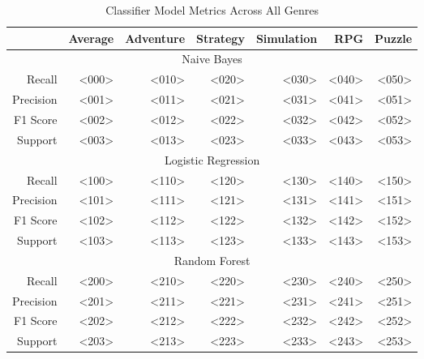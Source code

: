 \begin{table}[h]
    \centering
    \begin{tabular}{r|r|r|r|r|r|r}
        & Average & Adventure & Strategy & Simulation & RPG & Puzzle \\\hline
        \multicolumn{7}{c}{Naive Bayes} \\\hline
        Recall      & <000> & <010> & <020> & <030> & <040> & <050> \\
        Precision   & <001> & <011> & <021> & <031> & <041> & <051> \\
        F1 Score    & <002> & <012> & <022> & <032> & <042> & <052> \\
        Support     & <003> & <013> & <023> & <033> & <043> & <053> \\\hline
        \multicolumn{7}{c}{Logistic Regression} \\\hline
        Recall      & <100> & <110> & <120> & <130> & <140> & <150> \\
        Precision   & <101> & <111> & <121> & <131> & <141> & <151> \\
        F1 Score    & <102> & <112> & <122> & <132> & <142> & <152> \\
        Support     & <103> & <113> & <123> & <133> & <143> & <153> \\\hline
        \multicolumn{7}{c}{Random Forest} \\\hline
        Recall      & <200> & <210> & <220> & <230> & <240> & <250> \\
        Precision   & <201> & <211> & <221> & <231> & <241> & <251> \\
        F1 Score    & <202> & <212> & <222> & <232> & <242> & <252> \\
        Support     & <203> & <213> & <223> & <233> & <243> & <253> \\\hline
    \end{tabular}
    \caption{Classifier Model Metrics Across All Genres}
    \label{tab:combined_model_metrics_genre}
\end{table}